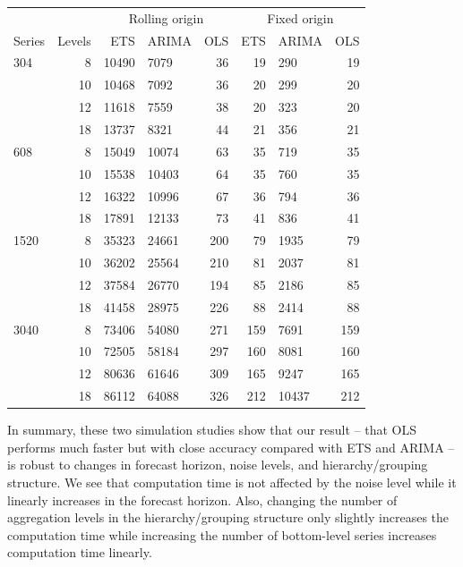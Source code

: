 \documentclass[11pt,a4paper,]{article}
\let\origtable\table
\let\endorigtable\endtable
\renewenvironment{table}[1][2] {
    \expandafter\origtable\expandafter[!htbp]
} {
    \endorigtable
}
\begin{document}
\begin{table}

\caption{\label{tab:TourismsimcomputationtimelevelNS}Computation time (seconds) for rolling and fixed origin reconciled forecasts using ETS, ARIMA and OLS, by number of bottom-level series (x-axis), and by levels of hierarchy (panels). Simulated series has error value 0.5 and 24 months test set.}
\centering
\begin{tabular}[t]{lrrlrrlr}
\toprule
\multicolumn{1}{c}{} & \multicolumn{1}{c}{} & \multicolumn{3}{c}{Rolling origin} & \multicolumn{3}{c}{Fixed origin} \\
\cmidrule(l{3pt}r{3pt}){3-5} \cmidrule(l{3pt}r{3pt}){6-8}
Series & Levels & ETS & ARIMA & OLS & ETS & ARIMA & OLS\\
\midrule
304 & 8 & 10490 & 7079 & 36 & 19 & 290 & 19\\
 & 10 & 10468 & 7092 & 36 & 20 & 299 & 20\\
 & 12 & 11618 & 7559 & 38 & 20 & 323 & 20\\
 & 18 & 13737 & 8321 & 44 & 21 & 356 & 21\\
608 & 8 & 15049 & 10074 & 63 & 35 & 719 & 35\\
 & 10 & 15538 & 10403 & 64 & 35 & 760 & 35\\
 & 12 & 16322 & 10996 & 67 & 36 & 794 & 36\\
 & 18 & 17891 & 12133 & 73 & 41 & 836 & 41\\
1520 & 8 & 35323 & 24661 & 200 & 79 & 1935 & 79\\
 & 10 & 36202 & 25564 & 210 & 81 & 2037 & 81\\
 & 12 & 37584 & 26770 & 194 & 85 & 2186 & 85\\
 & 18 & 41458 & 28975 & 226 & 88 & 2414 & 88\\
3040 & 8 & 73406 & 54080 & 271 & 159 & 7691 & 159\\
 & 10 & 72505 & 58184 & 297 & 160 & 8081 & 160\\
 & 12 & 80636 & 61646 & 309 & 165 & 9247 & 165\\
 & 18 & 86112 & 64088 & 326 & 212 & 10437 & 212\\
\bottomrule
\end{tabular}
\end{table}

In summary, these two simulation studies show that our result -- that OLS performs much faster but with close accuracy compared with ETS and ARIMA -- is robust to changes in forecast horizon, noise levels, and hierarchy/grouping structure. We see that computation time is not affected by the noise level while it linearly increases in the forecast horizon. Also, changing the number of aggregation levels in the hierarchy/grouping structure only slightly increases the computation time while increasing the number of bottom-level series increases computation time linearly.
\end{document}
